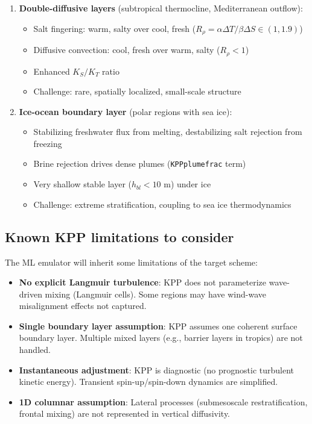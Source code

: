 \documentclass[11pt, a4paper]{article}
\begin{document}
\begin{enumerate}
    \item \textbf{Double-diffusive layers} (subtropical thermocline, Mediterranean outflow):
    \begin{itemize}
        \item Salt fingering: warm, salty over cool, fresh ($R_\rho = \alpha \Delta T/\beta \Delta S \in (1, 1.9)$)
        \item Diffusive convection: cool, fresh over warm, salty ($R_\rho < 1$)
        \item Enhanced $K_S/K_T$ ratio
        \item Challenge: rare, spatially localized, small-scale structure
    \end{itemize}

    \item \textbf{Ice-ocean boundary layer} (polar regions with sea ice):
    \begin{itemize}
        \item Stabilizing freshwater flux from melting, destabilizing salt rejection from freezing
        \item Brine rejection drives dense plumes (\texttt{KPPplumefrac} term)
        \item Very shallow stable layer ($h_{bl} < 10$ m) under ice
        \item Challenge: extreme stratification, coupling to sea ice thermodynamics
    \end{itemize}
\end{enumerate}

\subsection{Known KPP limitations to consider}

The ML emulator will inherit some limitations of the target scheme:

\begin{itemize}
    \item \textbf{No explicit Langmuir turbulence}: KPP does not parameterize wave-driven mixing (Langmuir cells). Some regions may have wind-wave misalignment effects not captured.

    \item \textbf{Single boundary layer assumption}: KPP assumes one coherent surface boundary layer. Multiple mixed layers (e.g., barrier layers in tropics) are not handled.

    \item \textbf{Instantaneous adjustment}: KPP is diagnostic (no prognostic turbulent kinetic energy). Transient spin-up/spin-down dynamics are simplified.

    \item \textbf{1D columnar assumption}: Lateral processes (submesoscale restratification, frontal mixing) are not represented in vertical diffusivity.
\end{itemize}
\end{document}
